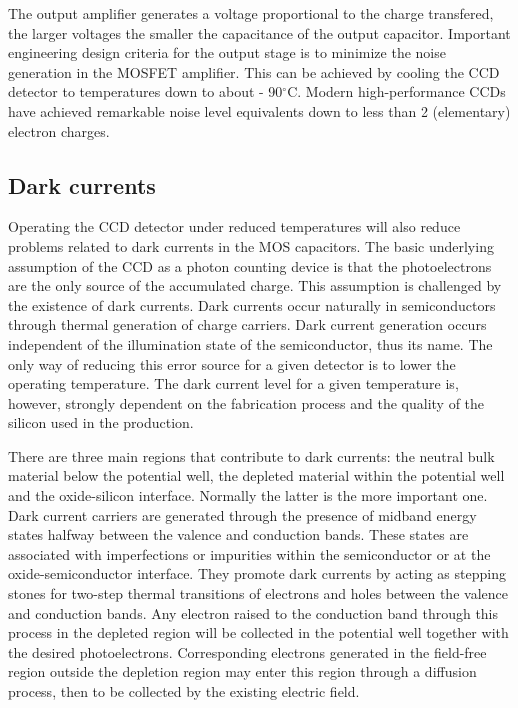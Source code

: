 \documentclass{article}
\begin{document}
The output amplifier generates a voltage proportional to the charge
transfered, the larger voltages the smaller the capacitance of the
output capacitor. Important engineering design criteria for the output
stage is to minimize the noise generation in the MOSFET
amplifier. This can be achieved by cooling the CCD detector to
temperatures down to about - 90$^\circ$C.  Modern
high-performance CCDs have achieved remarkable noise level
equivalents down to less than 2 (elementary) electron charges.

\subsection*{Dark currents}

Operating the CCD detector under reduced temperatures will also reduce
problems related to dark currents in the MOS capacitors. The basic
underlying assumption of the CCD as a photon counting device is that
the photoelectrons are the only source of the accumulated charge. This
assumption is challenged by the existence of dark currents. Dark
currents occur naturally in semiconductors through thermal generation
of charge carriers. Dark current generation occurs independent of the
illumination state of the semiconductor, thus its name. The only way
of reducing this error source for a given detector is to lower the
operating temperature. The dark current level for a given temperature
is, however, strongly dependent on the fabrication process and the
quality of the silicon used in the production.

There are three main regions that contribute to dark currents: the
neutral bulk material below the potential well, the depleted material
within the potential well and the oxide-silicon interface. Normally
the latter is the more important one. Dark current carriers are
generated through the presence of midband energy states halfway
between the valence and conduction bands. These states are associated
with imperfections or impurities within the semiconductor or at the
oxide-semiconductor interface. They promote dark currents by acting as
stepping stones for two-step thermal transitions of electrons and
holes between the valence and conduction bands. Any electron raised to
the conduction band through this process in the depleted region will
be collected in the potential well together with the desired
photoelectrons. Corresponding electrons generated in the field-free
region outside the depletion region may enter this region through a
diffusion process, then to be collected by the existing electric field.
 
\end{document}
